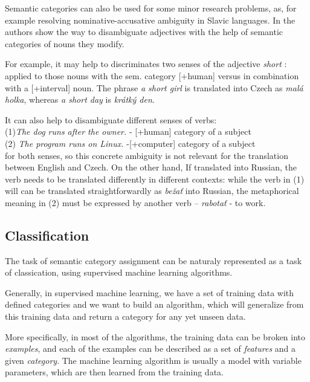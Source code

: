 \documentclass[letterpaper]{article}
\newcommand{\todofn}[1] {
 \footnote{\textbf{TODO : #1}}}
\begin{document}
Semantic categories can also be used for some minor research problems, as, for example
resolving nominative-accusative ambiguity in Slavic languages.
In \cite{principled_disam} the authors show the way to disambiguate adjectives
with the help of semantic categories of nouns they modify. 

For example, it may help 
to discriminates two senses of the  adjective \textit{short}
: applied to those nouns with the sem. category [+human] versus in combination
with a [+interval] noun. The phrase \textit{a short girl} is translated
into Czech as \textit{mal\'{a} holka}, whereas \textit{a short day} is \textit{kr\'{a}tk\'{y} den}.

It can also help to disambiguate different senses of verbs:\\ 
(1)\textit{The dog runs after the owner.} - [+human] category of a subject\\
(2) \textit{The program runs on Linux.} -[+computer] category of a subject \\
for both senses, so this concrete ambiguity is not relevant for
the translation between English and Czech. On the other hand, If translated into Russian, the verb needs to be translated differently in different contexts: while the verb in (1) will can be translated straightforwardly as \textit{be\v{z}a\v{t}} into Russian,
the metaphorical meaning in (2) must be expressed by another verb -- \textit{rabota\v{t}} - to work.

\subsection{Classification}
The task of semantic category assignment can be naturaly represented as a task of classication, using supervised machine learning algorithms.

Generally, in supervised machine learning, we have a set of training data with defined 
categories and we want to build an algorithm, which will generalize from this training data and return a category for any yet unseen data.

More specifically, in most of the algorithms, the training data can be broken into
\textit{examples}, and each of the examples can be described as a set of \textit{features} and a given \textit{category}. The machine learning algorithm is usually a model with variable parameters, which are then learned from the training data.
\end{document}
